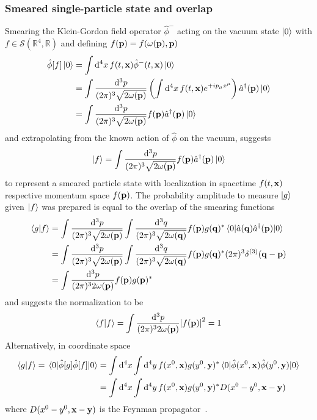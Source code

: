 \subsubsection{Smeared single-particle state and overlap}

Smearing the Klein-Gordon field operator $\hat\phi^-$ acting on the vacuum state $\ket{0}$ with $f\in\mathcal{S}(\mathbb{R}^4,\mathbb{R})$ and defining $f(\vb{p})=f(\omega(\vb{p}),\vb{p})$
\begin{align}
	\hat\phi[f]
	\ket{0}
	&=
	\int\dd[4]{x}
	f(t,\vb{x})
	\hat\phi^-(t,\vb{x})
	\ket{0}
	\\
	&=
	\int\frac{\dd[3]{p}}{(2\pi)^3\sqrt{2\omega(\vb{p})}}
	\left(
		\int\dd[4]{x}
		f(t,\vb{x})
		e^{+ip_\mu x^\mu}
	\right)
	\hat{a}^\dagger(\vb{p})
	\ket{0}
	\\
	&=
	\int\frac{\dd[3]{p}}{(2\pi)^3\sqrt{2\omega(\vb{p})}}
	f(\vb{p})
	\hat{a}^\dagger(\vb{p})
	\ket{0}
\end{align}
and extrapolating from the known action of $\hat\phi$ on the vacuum, suggests
\begin{equation}
	\ket{f}
	=
	\int\frac{\dd[3]{p}}{(2\pi)^3\sqrt{2\omega(\vb{p})}}
	f(\vb{p})
	\hat{a}^\dagger(\vb{p})
	\ket{0}
\end{equation}
to represent a smeared particle state with localization in spacetime $f(t,\vb{x})$ respective momentum space $f(\vb{p})$.
The probability amplitude to measure $\ket{g}$ given $\ket{f}$ was prepared is equal to the overlap of the smearing functions
\begin{equation}
	\begin{split}
		\bra{g}\ket{f}
		&=
		\int\frac{\dd[3]{p}}{(2\pi)^3\sqrt{2\omega(\vb{p})}}
		\int\frac{\dd[3]{q}}{(2\pi)^3\sqrt{2\omega(\vb{q})}}
		f(\vb{p})g(\vb{q})^*
		\expval{\hat{a}(\vb{q})\hat{a}^\dagger(\vb{p})}{0}
		\\
		&=
		\int\frac{\dd[3]{p}}{(2\pi)^3\sqrt{2\omega(\vb{p})}}
		\int\frac{\dd[3]{q}}{(2\pi)^3\sqrt{2\omega(\vb{q})}}
		f(\vb{p})g(\vb{q})^*
		(2\pi)^3\delta^{(3)}(\vb{q}-\vb{p})
		\\
		&=
		\int\frac{\dd[3]{p}}{(2\pi)^32\omega(\vb{p})}
		f(\vb{p})g(\vb{p})^*
	\end{split}
\end{equation}
and suggests the normalization to be
\begin{equation}
	\bra{f}\ket{f}
	=
	\int\frac{\dd[3]{p}}{(2\pi)^32\omega(\vb{p})}
	\abs{f(\vb{p})}^2
	=
	1
\end{equation}
Alternatively, in coordinate space
\begin{equation}
	\begin{split}
		\bra{g}\ket{f}
		=
		\expval{\hat\phi[g]\hat\phi[f]}{0}
		&=
		\int\dd[4]{x}
		\int\dd[4]{y}
		f(x^0,\vb{x})g(y^0,\vb{y})^*
		\expval{\hat\phi(x^0,\vb{x})\hat\phi(y^0,\vb{y})}{0}
		\\
		&=
		\int\dd[4]{x}
		\int\dd[4]{y}
		f(x^0,\vb{x})g(y^0,\vb{y})^*
		D(x^0-y^0,\vb{x}-\vb{y})
	\end{split}
\end{equation}
where $D(x^0-y^0,\vb{x}-\vb{y})$ is the Feynman propagator~\cite[p.~27]{Peskin1995}.

